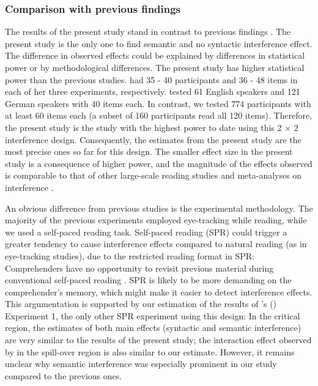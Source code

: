 \documentclass[a4paper, man, floatsintext]{apa7}
\begin{document}
\subsubsection{Comparison with previous findings}
The results of the present study stand in contrast to previous findings \citep{vandyke07, mertzen}. The present study is the only one to find semantic and no syntactic interference effect. The difference in observed effects could be explained by differences in statistical power or by methodological differences. The present study has higher statistical power than the previous studies. \citet{vandyke07} had 35 - 40 participants and 36 - 48 items in each of her three experiments, respectively. \textcite{mertzen} tested 61 English speakers and 121 German speakers with 40 items each. In contrast, we tested 774 participants with at least 60 items each (a subset of 160 participants read all 120 items). Therefore, the present study is the study with the highest power to date using this 2 $\times$ 2 interference design. Consequently, the estimates from the present study are the most precise ones so far for this design. The smaller effect size in the present study is a consequence of higher power, and the magnitude of the effects observed is comparable to that of other large-scale reading studies \citep{nicenboim} and meta-analyses on interference \citep{jaeger_etal_2017}.

An obvious difference from previous studies is the experimental methodology. The majority of the previous experiments employed eye-tracking while reading, while we used a self-paced reading task. Self-paced reading (SPR) could trigger a greater tendency to cause interference effects compared to natural reading (as in eye-tracking studies), due to the restricted reading format in SPR: Comprehenders have no opportunity to revisit previous material during conventional self-paced reading \citep[but see][]{BSPR}. SPR is likely to be more demanding on the comprehender's memory, which might make it easier to detect interference effects. This argumentation is supported by our estimation of the results of \citeauthor{vandyke07}'s (\citeyear{vandyke07}) Experiment 1, the only other SPR experiment using this design: %
In the critical region, the estimates of both main effects (syntactic and semantic interference) are very similar to the results of the present study; the interaction effect observed by \citeauthor{vandyke07} in the spill-over region is also similar to our estimate. However, it remains unclear why semantic interference was especially prominent in our study compared to the previous ones.
\end{document}
